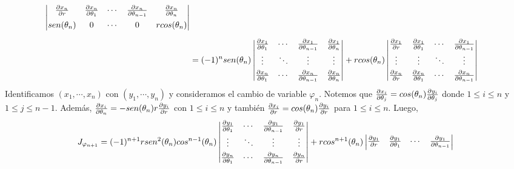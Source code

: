 \documentclass{article}
\begin{document}
\begin{enumerate}
\begin{align*}
\begin{vmatrix}
            \frac{\partial x_{n}}{\partial r} & \frac{\partial x_{n}}{\partial\theta_{1}} & \cdots & \frac{\partial x_{n}}{\partial\theta_{n-1}} & 
            \frac{\partial x_{n}}{\partial\theta_{n}} \\[2mm]
            sen(\theta_{n}) & 0 & \cdots & 0 & rcos(\theta_{n})
        \end{vmatrix} \\[2mm]
        &= (-1)^{n}sen(\theta_{n})\begin{vmatrix}
            \frac{\partial x_{1}}{\partial\theta_{1}} & \cdots & \frac{\partial x_{1}}{\partial\theta_{n-1}} & 
            \frac{\partial x_{1}}{\partial\theta_{n}} \\[1mm]
            \vdots & \ddots & \vdots & \vdots \\[1mm]
            \frac{\partial x_{n}}{\partial\theta_{1}} & \cdots & \frac{\partial x_{n}}{\partial\theta_{n-1}} & 
            \frac{\partial x_{n}}{\partial\theta_{n}}
        \end{vmatrix}+rcos(\theta_{n})\begin{vmatrix}
            \frac{\partial x_{1}}{\partial r} & \frac{\partial x_{1}}{\partial\theta_{1}} & \cdots & \frac{\partial x_{1}}{\partial\theta_{n-1}} \\[1mm]
            \vdots & \vdots & \ddots & \vdots \\[1mm]
            \frac{\partial x_{n}}{\partial r} & \frac{\partial x_{n}}{\partial\theta_{1}} & \cdots & \frac{\partial x_{n}}{\partial\theta_{n-1}}
        \end{vmatrix}
    \end{align*}
    Identificamos $(x_{1},\cdots,x_{n})$ con $(y_{1},\cdots,y_{n})$ y consideramos el cambio 
    de variable $\varphi_{n}$. Notemos que $\frac{\partial x_{i}}{\partial\theta_{j}}=cos(\theta_{n})\frac{\partial y_{i}}{\partial\theta_{j}}$ donde $1\leq i\leq n$ y $1\leq j\leq n-1$. Además, $\frac{\partial x_{i}}{\partial\theta_{n}}
    =-sen(\theta_{n})r\frac{\partial y_{i}}{\partial r}$ con $1\leq i\leq n$ y también $\frac{\partial x_{i}}{\partial r}
    =cos(\theta_{n})\frac{\partial y_{i}}{\partial r}$ para $1\leq i\leq n$. Luego,
    \begin{equation*}
        J_{\varphi_{n+1}} = (-1)^{n+1}rsen^{2}(\theta_{n})cos^{n-1}(\theta_{n})\begin{vmatrix}
            \frac{\partial y_{1}}{\partial\theta_{1}} & \cdots & \frac{\partial y_{1}}{\partial\theta_{n-1}} & 
            \frac{\partial y_{1}}{\partial r} \\[1mm]
            \vdots & \ddots & \vdots & \vdots \\[1mm]
            \frac{\partial y_{n}}{\partial\theta_{1}} & \cdots & \frac{\partial y_{n}}{\partial\theta_{n-1}} & 
            \frac{\partial y_{n}}{\partial r}
        \end{vmatrix}+rcos^{n+1}(\theta_{n})\begin{vmatrix}
            \frac{\partial y_{1}}{\partial r} & \frac{\partial y_{1}}{\partial\theta_{1}} & \cdots & \frac{\partial y_{1}}{\partial\theta_{n-1}} \\[1mm]

\end{vmatrix}
\end{equation*}
\end{enumerate}
\end{document}
